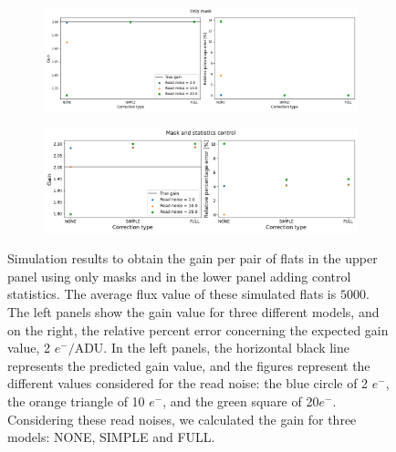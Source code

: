 \begin{figure}[!htb]
     \centering
     \begin{subfigure}[b]{\textwidth}
         \centering
         \includegraphics[width=\textwidth]{Figures/Simulation_masks.png}
     \end{subfigure}
     \vspace{3mm}
     \begin{subfigure}[b]{\textwidth}
         \centering
         \includegraphics[width=\textwidth]{Figures/Simulation_masks_stats.png}
     \end{subfigure}
        \caption{Simulation results to obtain the gain per pair of flats in the upper panel using only masks and in the lower panel adding control statistics. The average flux value of these simulated flats is $5000$. The left panels show the gain value for three different models, and on the right, the relative percent error concerning the expected gain value, 2 $e^-/$ADU. In the left panels, the horizontal black line represents the predicted gain value, and the figures represent the different values considered for the read noise: the blue circle of 2 $e^-$, the orange triangle of 10 $e^-$, and the green square of 20$e^-$. Considering these read noises, we calculated the gain for three models: NONE, SIMPLE and FULL.}
        \label{fig:simulation_masks}
\end{figure}

